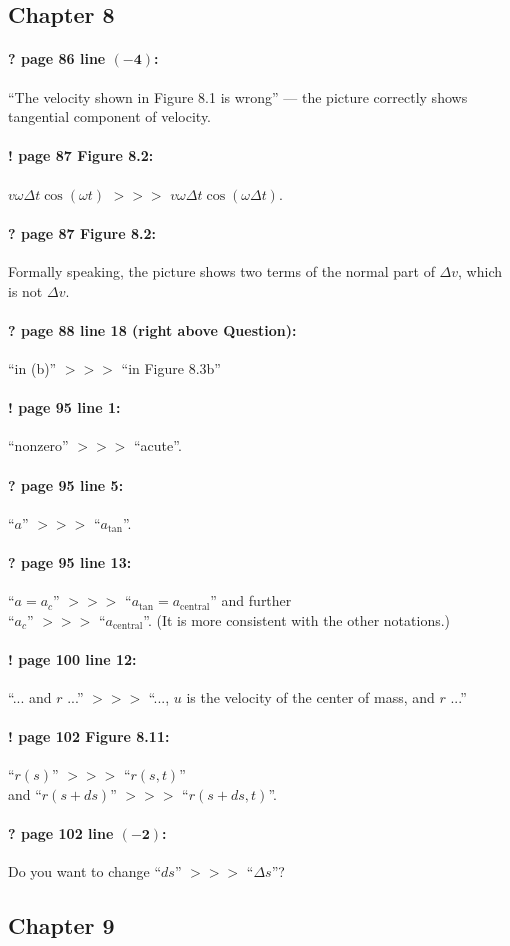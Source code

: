 \documentclass[twoside]{article}
\begin{document}
\subsection*{Chapter 8}

\paragraph{? page 86 line $\bm{(-4)}$:} ``The velocity shown in Figure 8.1 is wrong'' --- the picture correctly shows tangential component of velocity.

\paragraph{! page 87 Figure 8.2:} $v\omega\Delta t\cos(\omega t)$ $>\!>\!>$ $v\omega\Delta t\cos(\omega \Delta t)$.

\paragraph{? page 87 Figure 8.2:} Formally speaking, the picture shows two terms of the normal part of $\Delta v$, which is not $\Delta v$.

\paragraph{? page 88 line 18 (right above Question):} ``in (b)'' $>\!>\!>$ ``in Figure 8.3b''

\paragraph{! page 95 line 1:} ``nonzero'' $>\!>\!>$ ``acute''.

\paragraph{? page 95 line 5:} ``$a$'' $>\!>\!>$ ``$a_{\mathrm{tan}}$''.

\paragraph{? page 95 line 13:} ``$a=a_c$'' $>\!>\!>$ ``$a_{\mathrm{tan}}=a_{\mathrm{central}}$'' and further\\
``$a_c$'' $>\!>\!>$ ``$a_{\mathrm{central}}$''. (It is more consistent with the other notations.)

\paragraph{! page 100 line 12:} ``... and $r$ ...'' $>\!>\!>$ ``..., $u$ is the velocity of the center of mass, and $r$ ...''

\paragraph{! page 102 Figure 8.11:} ``$r(s)$'' $>\!>\!>$ ``$r(s,t)$''\\ and ``$r(s+ds)$'' $>\!>\!>$ ``$r(s+ds,t)$''.

\paragraph{? page 102 line $\bm{(-2)}$:} Do you want to change ``$ds$'' $>\!>\!>$ ``$\Delta s$''?

\subsection*{Chapter 9}
\end{document}
